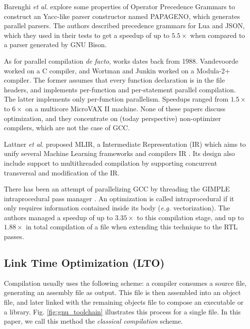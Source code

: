 \documentclass[runningheads]{llncs}
\begin{document}
Barenghi \textit{et al.} \cite{Barenghi:2015:PPM:2839536.2840146} explore
some properties of Operator Precedence Grammars to construct an Yacc-like
parser constructor named PAPAGENO, which generates parallel parsers. The
authors described precedence grammars for Lua and JSON, which they used in
their tests to get a speedup of up to $5.5\times$ when compared to a parser
generated by GNU Bison.

As for parallel compilation \textit{de facto}, works dates back from 1988.
Vandevoorde \cite{vandevoorde1988parallel} worked on a C compiler, and Wortman
and Junkin \cite{wortman1992} worked on a Modula-2+ compiler.  The former
assumes that every function declaration is in the file headers, and implements
per-function and per-statement parallel compilation. The latter implements only
per-function parallelism.  Speedups ranged from $1.5\times$ to $6\times$ on a
multicore MicroVAX II machine. None of these papers discuss optimization, and
they concentrate on (today perspective) non-optimizer compilers, which are not
the case of GCC.

Lattner \emph{et al.} proposed MLIR, a Intermediate Representation (IR) which aims to unify several
Machine Learning frameworks and compilers IR \cite{mlir}. Its design also include
support to multithreaded compilation by supporting concurrent transversal
and modification of the IR.

There has been an attempt of parallelizing GCC by threading the GIMPLE
intraprocedural pass manager \cite{bernardino2020improving}. An optimization is
called intraprocedural if it only requires information contained inside its
body (\textit{e.g.} vectorization). The authors managed a speedup of up to
$3.35\times$ to this compilation stage, and up to $1.88\times$ in total
compilation of a file when extending this technique to the RTL passes.

\subsection{Link Time Optimization (LTO)} \label{lto_section}

Compilation usually uses the following scheme: a compiler consumes a source file,
generating an assembly file as output. This file is then assembled into an object file,
and later linked with the remaining objects file to compose an executable or a library.
Fig. \ref{fig:gnu_toolchain} illustrates this process for a single file. In this paper,
we call this method the \emph{classical compilation} scheme.
\end{document}
